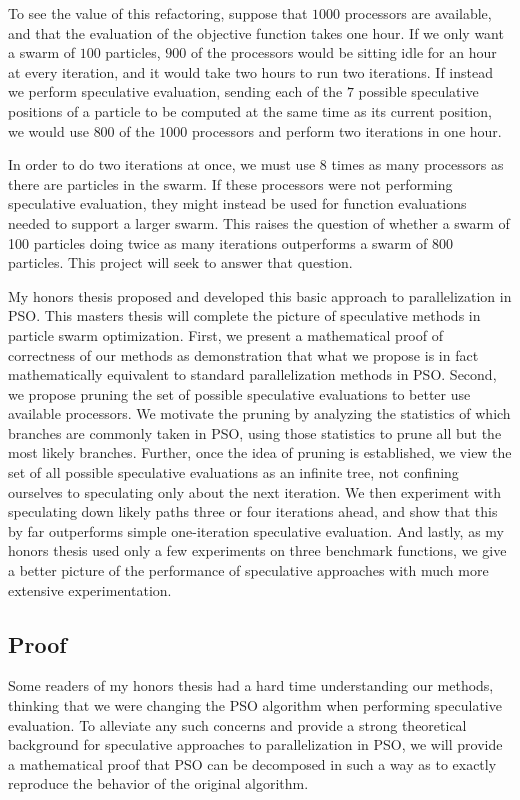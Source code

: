 \documentclass[ms]{byuprop}
\begin{document}
To see the value of this refactoring, suppose that $1000$ processors are
available, and that the evaluation of the objective function takes one hour.
If we only want a swarm of $100$ particles, $900$ of the processors would be
sitting idle for an hour at every iteration, and it would take two hours to run
two iterations.  If instead we perform speculative evaluation, sending each of
the $7$ possible speculative positions of a particle to be computed at the same
time as its current position, we would use $800$ of the $1000$ processors and
perform two iterations in one hour.

In order to do two iterations at once, we must use 8 times as many processors
as there are particles in the swarm.  If these processors were not performing
speculative evaluation, they might instead be used for function evaluations
needed to support a larger swarm.  This raises the question of whether a swarm
of 100 particles doing twice as many iterations outperforms a swarm of 800
particles.  This project will seek to answer that question.

My honors thesis proposed and developed this basic approach to parallelization
in PSO.  This masters thesis will complete the picture of speculative methods
in particle swarm optimization.  First, we present a mathematical proof of
correctness of our methods as demonstration that what we propose is in fact
mathematically equivalent to standard parallelization methods in PSO.  Second,
we propose pruning the set of possible speculative evaluations to better use
available processors.  We motivate the pruning by analyzing the statistics of
which branches are commonly taken in PSO, using those statistics to prune all
but the most likely branches.  Further, once the idea of pruning is
established, we view the set of all possible speculative evaluations as an
infinite tree, not confining ourselves to speculating only about the next
iteration.  We then experiment with speculating down likely paths three or four
iterations ahead, and show that this by far outperforms simple one-iteration
speculative evaluation.  And lastly, as my honors thesis used only a few
experiments on three benchmark functions, we give a better picture of the
performance of speculative approaches with much more extensive experimentation.

\subsection{Proof}

Some readers of my honors thesis had a hard time understanding our methods,
thinking that we were changing the PSO algorithm when performing speculative
evaluation.  To alleviate any such concerns and provide a strong theoretical
background for speculative approaches to parallelization in PSO, we will
provide a mathematical proof that PSO can be decomposed in such a way as to
exactly reproduce the behavior of the original algorithm.
\end{document}
